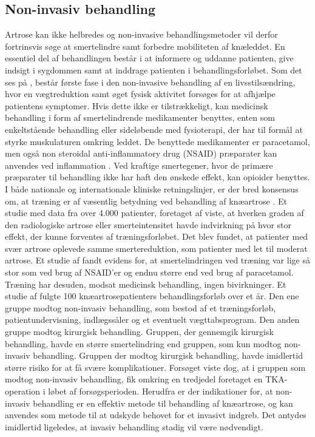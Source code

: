 \subsection{Non-invasiv behandling}
Artrose kan ikke helbredes og non-invasive behandlingsmetoder vil derfor fortrinsvis søge at smertelindre samt forbedre mobiliteten af knæleddet. En essentiel del af behandlingen består i at informere og uddanne patienten, give indsigt i sygdommen samt at inddrage patienten i behandlingsforløbet. \citep{brostrom2012} Som det ses på , består første fase i den non-invasive behandling af en livsstilsændring, hvor en vægtreduktion samt øget fysisk aktivitet forsøges for at afhjælpe patientens symptomer. Hvis dette ikke er tilstrækkeligt, kan medicinsk behandling i form af smertelindrende medikamenter benyttes, enten som enkeltstående behandling eller sideløbende med fysioterapi, der har til formål at styrke muskulaturen omkring leddet.
De benyttede medikamenter er paracetamol, men også non steroidal anti-inflammatory drug (NSAID) præparater kan anvendes ved inflammation \citep{schroder}. Ved kraftige smertegener, hvor de primære præparater til behandling ikke har haft den ønskede effekt, kan opioider benyttes. \citep{brostrom2012}\\
I både nationale og internationale kliniske retningslinjer, er der bred konsensus om, at træning er af væsentlig betydning ved behandling af knæartrose \citep{brostrom2012}. Et studie med data fra over 4.000 patienter, foretaget af  viste, at hverken graden af den radiologiske artrose eller smerteintensitet havde indvirkning på hvor stor effekt, der kunne forventes af træningsforløbet. Det blev fundet, at patienter med svær artrose oplevede samme smertereduktion, som patienter med let til moderat artrose. Et studie af  fandt evidens for, at smertelindringen ved træning var lige så stor som ved brug af NSAID'er og endnu større end ved brug af paracetamol. Træning har desuden, modsat medicinsk behandling, ingen bivirkninger. \citep{sorenskou}
Et studie af  fulgte 100 knæartrosepatienters behandlingsforløb over et år. Den ene gruppe modtog non-invasiv behandling, som bestod af et træningsforløb, patientundervisning, indlægssåler og et eventuelt vægttabsprogram. Den anden gruppe modtog kirurgisk behandling. Gruppen, der gennemgik kirurgisk behandling, havde en større smertelindring end gruppen, som kun modtog non-invasiv behandling. Gruppen der modtog kirurgisk behandling, havde imidlertid større risiko for at få svære komplikationer. Forsøget viste dog, at i gruppen som modtog non-invasiv behandling, fik omkring en tredjedel foretaget en TKA-operation i løbet af forsøgsperioden. \citep{newEngland} Herudfra er der indikationer for, at non-invasiv behandling er en effektiv metode til behandling af knæartrose, og kan anvendes som metode til at udskyde behovet for et invasivt indgreb. Det antydes imidlertid ligeledes, at invasiv behandling stadig vil være nødvendigt. 

